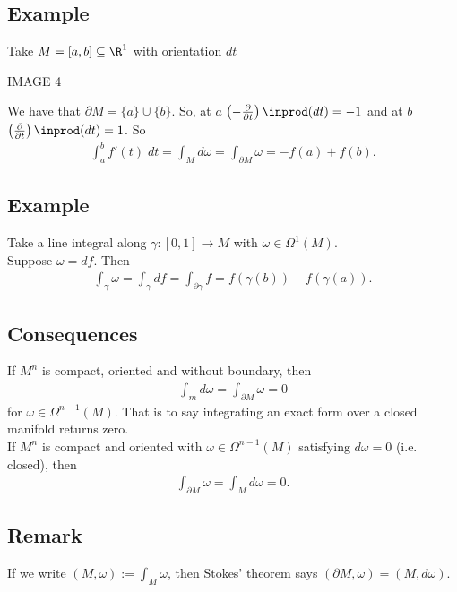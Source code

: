 \documentclass[11pt]{article}
\begin{document}
\subsection*{Example}
\label{sec:org31784df}
Take \(M=[a,b]\subseteq\R^{1}\) with orientation \(dt\)\\
\begin{center}
IMAGE 4\\
\end{center}
We have that \(\partial M=\{a\}\cup\{b\}\). So, at \(a\) \(\left( -\frac{\partial}{\partial t} \right)\inprod(dt)=-1\) and at \(b\) \(\left( \frac{\partial}{\partial t} \right)\inprod(dt)=1\). So\\
\begin{align*}
  \int_{a}^{b}f'(t)\;dt
  =\int_{M}d\omega
  =\int_{\partial M}\omega
  =-f(a)+f(b).
\end{align*}
\subsection*{Example}
\label{sec:org4a6b437}
Take a line integral along \(\gamma:[0,1]\to M\) with \(\omega\in\Omega^{1}(M)\).\\
Suppose \(\omega=df\). Then\\
\begin{align*}
  \int_{\gamma}\omega
  =\int_{\gamma}df
  =\int_{\partial\gamma}f
  =f(\gamma(b))-f(\gamma(a)).
\end{align*}
\subsection*{Consequences}
\label{sec:orgb1d4c9d}
If \(M^{n}\) is compact, oriented and without boundary, then\\
\begin{align*}
  \int_{m}d\omega
  =\int_{\partial M}\omega
  =0
\end{align*}
for \(\omega\in\Omega^{n-1}(M)\). That is to say integrating an exact form over a closed manifold returns zero.\\
If \(M^{n}\) is compact and oriented with \(\omega\in\Omega^{n-1}(M)\) satisfying \(d\omega=0\) (i.e. closed), then\\
\begin{align*}
  \int_{\partial M}\omega
  =\int_{M}d\omega
  =0.
\end{align*}
\subsection*{Remark}
\label{sec:orgec5f4f6}
If we write \((M,\omega):=\int_{M}\omega\), then Stokes' theorem says \((\partial M,\omega)=(M,d\omega)\).\\
\end{document}
